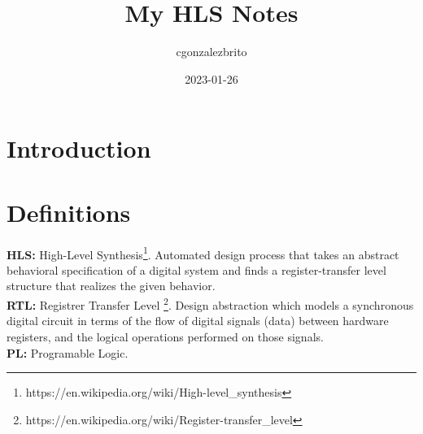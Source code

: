 \documentclass{article}
\title{My HLS Notes}
\date{2023-01-26}
\author{cgonzalezbrito}
\begin{document}
  \maketitle
  \newpage
  \section{Introduction}
  
  \iffalse TODO: \fi

  \newpage
  \section{Definitions}

  \textbf{HLS:} High-Level Synthesis\footnote{\label{HLS}https://en.wikipedia.org/wiki/High-level_synthesis}. Automated design process that takes an abstract behavioral specification of a digital system and finds a register-transfer level structure that realizes the given behavior.\\
  \textbf{RTL:} Registrer Transfer Level \footnote{\label{RTL}https://en.wikipedia.org/wiki/Register-transfer_level}. Design abstraction which models a synchronous digital circuit in terms of the flow of digital signals (data) between hardware registers, and the logical operations performed on those signals.\\
  \textbf{PL:} Programable Logic.
\end{document}
